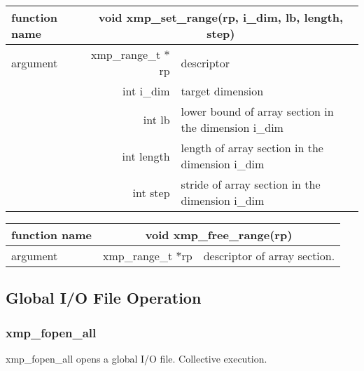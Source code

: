    \begin{table}[h]
    \begin{center}
      \begin{tabular}{|l|r|p{90mm}|}
      \hline
          {\bf function name}  & \multicolumn{2}{c|}{\bf void xmp\_set\_range(rp, i\_dim, lb, length, step)}  \\ \hline \hline
          argument & xmp\_range\_t $*$rp  & descriptor \\ \cline{2-3}
          & int i\_dim & target dimension \\ \cline{2-3}
          & int lb & lower bound of array section in the dimension i\_dim \\ \cline{2-3}
          & int length & length of array section in the dimension i\_dim \\ \cline{2-3}
          & int step & stride of array section in the dimension i\_dim \\ \hline
      \end{tabular}
     \end{center}
   \end{table}
\clearpage
   \begin{table}[h]
    \begin{center}
      \begin{tabular}{|l|r|p{90mm}|}
      \hline
      {\bf function name}  & \multicolumn{2}{c|}{\bf void xmp\_free\_range(rp)}  \\ \hline \hline
      argument & xmp\_range\_t $*$rp & descriptor of array section. \\ \hline
      \end{tabular}
     \end{center}
   \end{table}
   
   \subsection{Global I/O File Operation}

   \subsubsection{xmp\_fopen\_all}
   xmp\_fopen\_all opens a global I/O file. Collective execution.
   

